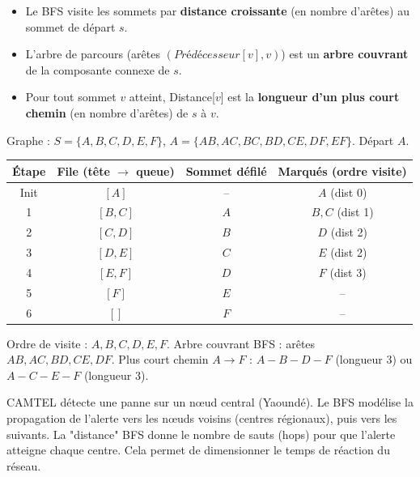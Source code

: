 \documentclass[11pt]{article}
\begin{document}
\begin{propriete}
\begin{itemize}
  \item Le BFS visite les sommets par \textbf{distance croissante} (en nombre d'arêtes) au sommet de départ $s$.
  \item L'arbre de parcours (arêtes $(Prédécesseur[v], v)$) est un \textbf{arbre couvrant} de la composante connexe de $s$.
  \item Pour tout sommet $v$ atteint, Distance[$v$] est la \textbf{longueur d'un plus court chemin} (en nombre d'arêtes) de $s$ à $v$.
\end{itemize}
\end{propriete}

\begin{exemplebox}
Graphe : $S=\{A,B,C,D,E,F\}$, $A=\{AB, AC, BC, BD, CE, DF, EF\}$. Départ $A$.
\begin{center}
\begin{tabular}{|c|c|c|c|}
\hline
\textbf{Étape} & \textbf{File (tête $\to$ queue)} & \textbf{Sommet défilé} & \textbf{Marqués (ordre visite)} \\
\hline
Init & $[A]$ & -- & $A$ (dist 0) \\
1 & $[B, C]$ & $A$ & $B, C$ (dist 1) \\
2 & $[C, D]$ & $B$ & $D$ (dist 2) \\
3 & $[D, E]$ & $C$ & $E$ (dist 2) \\
4 & $[E, F]$ & $D$ & $F$ (dist 3) \\
5 & $[F]$ & $E$ & -- \\
6 & $[]$ & $F$ & -- \\
\hline
\end{tabular}
\end{center}
Ordre de visite : $A, B, C, D, E, F$.
Arbre couvrant BFS : arêtes $AB, AC, BD, CE, DF$.
Plus court chemin $A \to F$ : $A-B-D-F$ (longueur 3) ou $A-C-E-F$ (longueur 3).
\end{exemplebox}

\begin{savaistu}
CAMTEL détecte une panne sur un nœud central (Yaoundé). Le BFS modélise la propagation de l'alerte vers les nœuds voisins (centres régionaux), puis vers les suivants. La "distance" BFS donne le nombre de sauts (hops) pour que l'alerte atteigne chaque centre. Cela permet de dimensionner le temps de réaction du réseau.
\end{savaistu}
\end{document}
